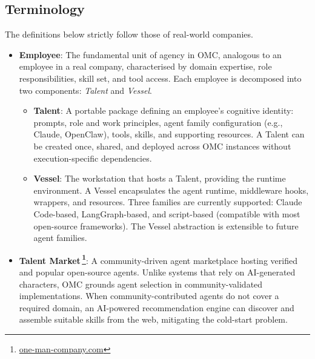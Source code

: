 \documentclass[11pt,a4paper]{article}
\begin{document}
\subsection{Terminology}
The definitions below strictly follow those of real-world companies.
\begin{itemize}

    \item \textbf{Employee}: The fundamental unit of agency in OMC, analogous to an employee in a real company, characterised by domain expertise, role responsibilities, skill set, and tool access.  Each employee is decomposed into two components: \textit{Talent} and \textit{Vessel}.

    \begin{itemize}
    \item \textbf{Talent}: A portable package defining an employee’s cognitive identity: prompts, role and work principles, agent family configuration (e.g., Claude, OpenClaw), tools, skills, and supporting resources.  A Talent can be created once, shared, and deployed across OMC instances without execution-specific dependencies.

    \item \textbf{Vessel}: The workstation that hosts a Talent, providing the runtime environment.  A Vessel encapsulates the agent runtime, middleware hooks, wrappers, and resources.  Three families are currently supported: Claude Code-based, LangGraph-based, and script-based (compatible with most open-source frameworks).  The Vessel abstraction is extensible to future agent families.

    \end{itemize}

    \item \textbf{Talent Market\,\footnote{\url{one-man-company.com}}}: A community-driven agent marketplace hosting verified and popular open-source agents.  Unlike systems that rely on AI-generated characters, OMC grounds agent selection in community-validated implementations.  When community-contributed agents do not cover a required domain, an AI-powered recommendation engine can discover and assemble suitable skills from the web, mitigating the cold-start problem.


\end{itemize}
\end{document}
